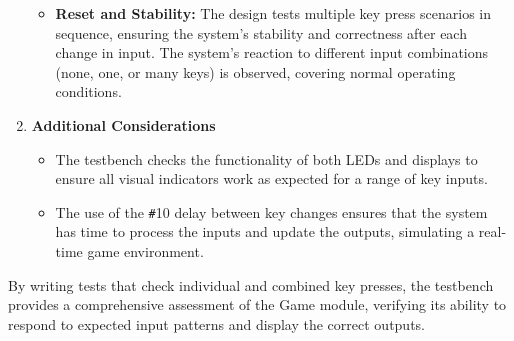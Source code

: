 \documentclass{report}
\begin{document}
\begin{enumerate}
\begin{itemize}
        \item \textbf{Reset and Stability:} The design tests multiple key press scenarios in sequence, ensuring the system's stability and correctness after each change in input. The system's reaction to different input combinations (none, one, or many keys) is observed, covering normal operating conditions.
    \end{itemize}
    \item \textbf{Additional Considerations}
    \begin{itemize}
        \item The testbench checks the functionality of both LEDs and displays to ensure all visual indicators work as expected for a range of key inputs.
        \item The use of the \verb|#|10 delay between key changes ensures that the system has time to process the inputs and update the outputs, simulating a real-time game environment.
    \end{itemize}
\end{enumerate}
By writing tests that check individual and combined key presses, the testbench provides a comprehensive assessment of the Game module, verifying its ability to respond to expected input patterns and display the correct outputs.
\end{document}
